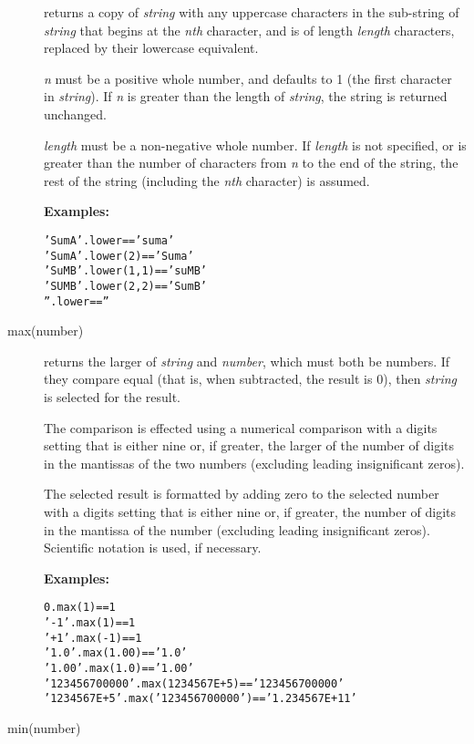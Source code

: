 \begin{description}
returns a copy of \emph{string} with any uppercase characters in
the sub-string of \emph{string} that begins at the \emph{n}\emph{th}
character, and is of length \emph{length} characters, replaced by
their lowercase equivalent.
 
\emph{n} must be a positive whole number, and defaults to 1 (the
first character in \emph{string}).  If \emph{n} is greater than
the length of \emph{string}, the string is returned unchanged.
 
\emph{length} must be a non-negative whole number.
If \emph{length} is not specified, or is greater than the number of
characters from \emph{n} to the end of the string, the rest of the
string (including the \emph{n}\emph{th} character) is assumed.
 
\textbf{Examples:}
\begin{alltt}
'SumA'.lower      == 'suma'
'SumA'.lower(2)   == 'Suma'
'SuMB'.lower(1,1) == 'suMB'
'SUMB'.lower(2,2) == 'SumB'
''.lower          == ''
\end{alltt}
\item[max(number)]\label{refmax}

returns the larger of \emph{string} and \emph{number}, which
must both be numbers.  If they compare equal (that is, when subtracted,
the result is 0), then \emph{string} is selected for the result.
 
The comparison is effected using a numerical comparison with a digits
setting that is either nine or, if greater, the larger of the number of
digits in the mantissas of the two numbers (excluding leading
insignificant zeros).
 
The selected result is formatted by adding zero to the selected number
with a digits setting that is either nine or, if greater, the number of
digits in the mantissa of the number (excluding leading insignificant
zeros).
Scientific notation is used, if necessary.
 
\textbf{Examples:}
\begin{alltt}
0.max(1)          ==1
'-1'.max(1)       ==1
'+1'.max(-1)      ==1
'1.0'.max(1.00)   =='1.0'
'1.00'.max(1.0)   =='1.00'
'123456700000'.max(1234567E+5)   == '123456700000'
'1234567E+5'.max('123456700000') == '1.234567E+11'
\end{alltt}
\item[min(number)]\label{refmin}


\end{description}
